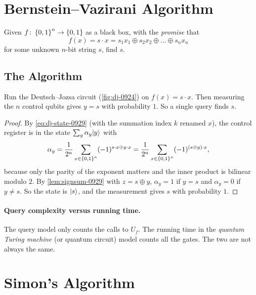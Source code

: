 \section{Bernstein--Vazirani Algorithm}

\begin{problem}
    Given $f \colon \left\lbrace0,1\right\rbrace^n \to \left\lbrace0,1\right\rbrace$ as a black box, with the \emph{promise} that
    \[f(x) = s \cdot x = s_1 x_1 \oplus s_2 x_2 \oplus \dots \oplus s_n x_n\]
    for some unknown $n$-bit string $s$, find $s$.
\end{problem}

\subsection{The Algorithm}

\begin{theorem}\label{thm:bv-0929}
    Run the Deutsch--Jozsa circuit (\cref{fig:dj-0924}) on $f(x) = s \cdot x$. Then measuring the $n$
    control qubits gives $y = s$ with probability $1$. So a single query finds $s$.
\end{theorem}

\begin{proof}
    By \cref{eq:dj-state-0929} (with the summation index $k$ renamed $x$), the control register is in
    the state $\sum_{y} \alpha_y \lvert y \rangle$ with
    \[\alpha_y = \frac{1}{2^n} \sum_{x \in \left\lbrace0,1\right\rbrace^n} (-1)^{s \cdot x \oplus y \cdot x}
        = \frac{1}{2^n} \sum_{x \in \left\lbrace0,1\right\rbrace^n} (-1)^{(s \oplus y) \cdot x},\]
    because only the parity of the exponent matters and the inner product is bilinear modulo $2$. By
    \cref{lem:signsum-0929} with $z = s \oplus y$, $\alpha_y = 1$ if $y = s$ and $\alpha_y = 0$ if
    $y \neq s$. So the state is $\lvert s \rangle$, and the measurement gives $s$ with probability $1$.
\end{proof}

\paragraph{Query complexity versus running time.} The query model only counts the calls to $U_f$. The
running time in the \emph{quantum Turing machine} (or quantum circuit) model counts all the gates.
The two are not always the same.

\section{Simon's Algorithm}

